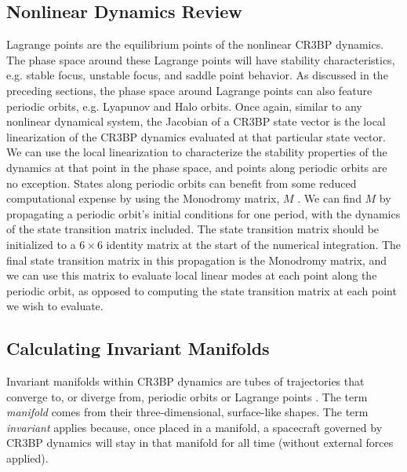 \documentclass[conf]{new-aiaa}
\begin{document}
\begin{multicols}{2}
\subsection{Nonlinear Dynamics Review}
Lagrange points 
are the equilibrium points of the nonlinear CR3BP dynamics.
The phase space around these Lagrange points will have stability 
characteristics, e.g. stable focus, unstable focus, and
saddle point behavior. As discussed in the preceding sections, the phase
space around Lagrange points can also feature periodic orbits, e.g. 
Lyapunov and Halo orbits. Once again, similar to any nonlinear 
dynamical system, the Jacobian of a CR3BP state vector is the 
local linearization of the CR3BP dynamics evaluated at that particular 
state vector. We can use the local linearization to characterize the 
stability properties of the dynamics at that point in the phase space, 
and points along periodic orbits are no exception. States 
along periodic orbits can benefit from some reduced computational 
expense by using the Monodromy matrix, $M$ \cite{rund2018interplanetary}. 
We can find $M$ by 
propagating a periodic orbit's initial conditions for one period, 
with the dynamics of the state transition matrix included. The 
state transition matrix should be initialized to a $6 \times 6$ 
identity matrix at the start of the numerical integration. 
The final state transition matrix in this propagation is the 
Monodromy matrix, and we can use this matrix to 
evaluate local linear modes at each point along the periodic 
orbit, as opposed to computing the state transition matrix at each point 
we wish to evaluate. 

\subsection{Calculating Invariant Manifolds}
Invariant manifolds within CR3BP dynamics are tubes of trajectories
that converge to, or diverge from, periodic orbits or Lagrange points
\cite{rund2018interplanetary} \cite{topputo2005low}. The term 
\textit{manifold} comes from their three-dimensional, surface-like
shapes. The term \textit{invariant} applies because, once placed in 
a manifold, a spacecraft governed by CR3BP dynamics
will stay in that manifold for all time (without external forces applied).


\end{multicols}
\end{document}
